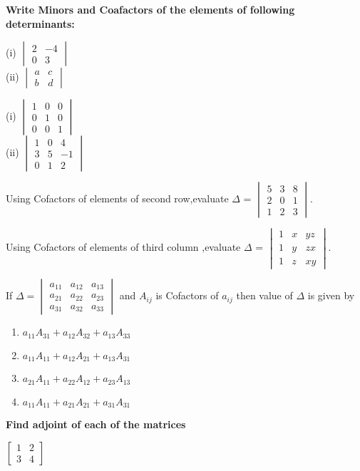 \textbf{Write Minors and Coafactors of the elements of following determinants:}
\item (i) $\begin{vmatrix}
2&-4 \\ 0 &3 \end{vmatrix}$ \\
(ii) $\begin{vmatrix}a&c \\ b &d\end{vmatrix}$
\item (i) $\begin{vmatrix}1&0&0 \\ 0&1&0 \\ 0&0&1\end{vmatrix}$\\
(ii) $\begin{vmatrix}1&0&4 \\ 3&5&-1 \\ 0&1&2\end{vmatrix}$
\item Using Cofactors of elements of second row,evaluate $\Delta$ =
$\begin{vmatrix} 5&3&8 \\ 2&0&1 \\ 1&2&3 \end{vmatrix}.$
\item Using Cofactors of elements of third column ,evaluate $\Delta$ = 
$\begin{vmatrix} 1&x&yz \\ 1&y&zx \\ 1&z&xy \end{vmatrix}.$
\item If $\Delta = \begin{vmatrix}
a_{11}&a_{12}&a_{13} \\ a_{21}&a_{22}&a_{23} \\ a_{31}&a_{32}&a_{33}
\end{vmatrix}$ and $A_{ij}$ is Cofactors of $a_{ij}$ then value of $\Delta$ is given by 
\begin{enumerate}
\item $a_{11}A_{31}+a_{12}A_{32}+a_{13}A_{33}$
\item $a_{11}A_{11}+a_{12}A_{21}+a_{13}A_{31}$
\item $a_{21}A_{11}+a_{22}A_{12}+a_{23}A_{13}$
\item $a_{11}A_{11}+a_{21}A_{21}+a_{31}A_{31}$
\end{enumerate} 
\textbf{Find adjoint of each of the matrices} 
\item $\begin{bmatrix}
1&2 \\ 3&4
\end{bmatrix}$
